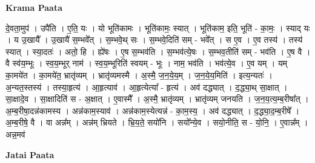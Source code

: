\documentclass[17pt]{extarticle}
\begin{document}
\textbf{Krama Paata} \newline

दे॒वता॒मुप॑ । उपै॑ति । ए॒ति॒ यः । यो भूति॑कामः । भूति॑कामः॒ स्यात् । भूति॑काम॒ इति॒ भूति॑ - का॒मः॒ । स्याद् यः । य उ॒खायै᳚ । उ॒खायै॑ स॒म्भवे᳚त् । स॒म्भवे॒थ् सः । स॒म्भवे॒दिति॑ सम् - भवे᳚त् । स ए॒व । ए॒व तस्य॑ । तस्य॑ स्यात् । स्या॒दतः॑ । अतो॒ हि । ह्ये॑षः । ए॒ष स॒म्भव॑ति । स॒म्भव॑त्ये॒षः । स॒म्भव॒तीति॑ सम् - भव॑ति । ए॒ष वै । वै स्व॑य॒म्भूः । स्व॒य॒म्भूर् नाम॑ । स्व॒य॒म्भूरिति॑ स्वयम् - भूः । नाम॒ भव॑ति । भव॑त्ये॒व । ए॒व यम् । यम् का॒मये॑त । का॒मये॑त॒ भ्रातृ॑व्यम् । भ्रातृ॑व्यमस्मै । अ॒स्मै॒ ज॒न॒ये॒य॒म् । ज॒न॒ये॒य॒मिति॑ । इत्य॒न्यतः॑ । अ॒न्यत॒स्तस्य॑ । तस्या॒हृत्य॑ । आ॒हृत्याव॑ । आ॒हृत्येत्या᳚ - हृत्य॑ । अव॑ दद्ध्यात् । द॒द्ध्या॒थ् सा॒क्षात् । सा॒क्षादे॒व । सा॒क्षादिति॑ स - अ॒क्षात् । ए॒वास्मै᳚ । अ॒स्मै॒ भ्रातृ॑व्यम् । भ्रातृ॑व्यम् जनयति । ज॒न॒य॒त्य॒म्ब॒रीषा᳚त् । अ॒म्ब॒रीषा॒दन्न॑कामस्य । अन्न॑काम॒स्याव॑ । अन्न॑काम॒स्येत्यन्न॑ - का॒म॒स्य॒ । अव॑ दद्ध्यात् । द॒द्ध्या॒द॒म्ब॒रीषे᳚ । अ॒म्ब॒रीषे॒ वै । वा अन्न᳚म् । अन्न॑म् भ्रियते । भ्रि॒य॒ते॒ सयो॑नि । सयो᳚न्ये॒व । सयो॒नीति॒ स - यो॒नि॒ । ए॒वान्न᳚म् । अन्न॒मव॑ \newline

\textbf{Jatai Paata} \newline
\end{document}
